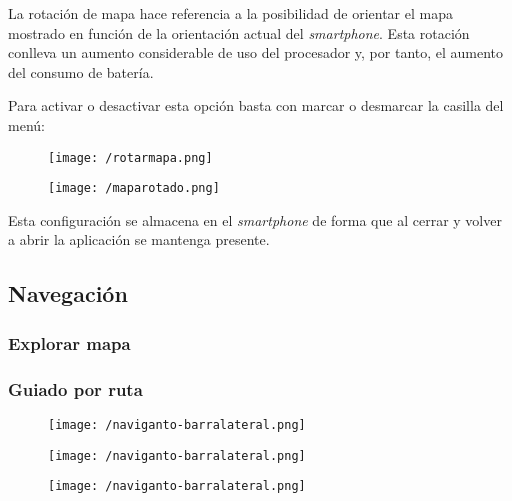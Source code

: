 La rotación de mapa hace referencia a la posibilidad de orientar el mapa mostrado en función de la
orientación actual del \emph{smartphone}. Esta rotación conlleva un aumento considerable de uso del
procesador y, por tanto, el aumento del consumo de batería.

Para activar o desactivar esta opción basta con marcar o desmarcar la casilla del menú:

\begin{figure}[h]
  \begin{minipage}[b]{0.5\linewidth}
    \begin{center}
      \texttt{[image: /rotarmapa.png]}
    \end{center}
  \end{minipage}
  \begin{minipage}[b]{0.5\linewidth}
    \begin{center}
      \texttt{[image: /maparotado.png]}
    \end{center}
  \end{minipage}
\end{figure}

Esta configuración se almacena en el \emph{smartphone} de forma que al cerrar y volver a abrir la
aplicación se mantenga presente.

\subsection{Navegación}

\subsubsection{Explorar mapa}



\subsubsection{Guiado por ruta}


\begin{figure}[h]
  \begin{minipage}[b]{0.5\linewidth}
    \begin{center}
      \texttt{[image: /naviganto-barralateral.png]}
    \end{center}
  \end{minipage}
  \begin{minipage}[b]{0.5\linewidth}
    \begin{center}
      \texttt{[image: /naviganto-barralateral.png]}
    \end{center}
  \end{minipage}
\end{figure}

\begin{figure}[h]
  \begin{center}
    \texttt{[image: /naviganto-barralateral.png]}
  \end{center}
\end{figure}

